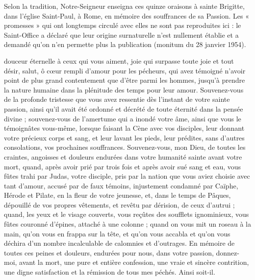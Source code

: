 \begin{notice}
Selon la tradition, Notre-Seigneur enseigna ces quinze oraisons à sainte Brigitte, dans l’église Saint-Paul, à Rome, en mémoire des souffrances de sa Passion. Les « promesses » qui ont longtemps circulé avec elles ne sont pas reproduites ici : le Saint-Office a déclaré que leur origine surnaturelle n’est nullement établie et a demandé qu’on n’en permette plus la publication (monitum du 28 janvier 1954).
\end{notice}
 douceur éternelle à ceux qui vous aiment, joie qui surpasse toute joie et tout désir, salut, ô cœur rempli d’amour pour les pécheurs, qui avez témoigné n’avoir point de plus grand contentement que d’être parmi les hommes, jusqu’à prendre la nature humaine dans la plénitude des temps pour leur amour. Souvenez-vous de la profonde tristesse que vous avez ressentie dès l’instant de votre sainte passion, ainsi qu’il avait été ordonné et décrété de toute éternité dans la pensée divine ; souvenez-vous de l’amertume qui a inondé votre âme, ainsi que vous le témoignâtes vous-même, lorsque faisant la Cène avec vos disciples, leur donnant votre précieux corps et sang, et leur lavant les pieds, leur prédites, sans d’autres consolations, vos prochaines souffrances. Souvenez-vous, mon Dieu, de toutes les craintes, angoisses et douleurs endurées dans votre humanité sainte avant votre mort, quand, après avoir prié par trois fois et après avoir sué sang et eau, vous fûtes trahi par Judas, votre disciple, pris par la nation que vous aviez choisie avec tant d’amour, accusé par de faux témoins, injustement condamné par Caïphe, Hérode et Pilate, en la fleur de votre jeunesse, et, dans le temps de Pâques, dépouillé de vos propres vêtements, et revêtu par dérision, de ceux d’autrui ; quand, les yeux et le visage couverts, vous reçûtes des soufflets ignominieux, vous fûtes couronné d’épines, attaché à une colonne ; quand on vous mit un roseau à la main, qu’on vous en frappa sur la tête, et qu’on vous accabla et qu’on vous déchira d’un nombre incalculable de calomnies et d’outrages. En mémoire de toutes ces peines et douleurs, endurées pour nous, dans votre passion, donnez-moi, avant la mort, une pure et entière confession, une vraie et sincère contrition, une digne satisfaction et la rémission de tous mes péchés. Ainsi soit-il.
